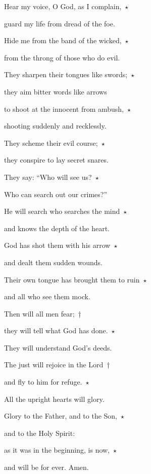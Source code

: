 \noindent Hear my voice, O God, as I complain,~$\star$~\nopagebreak

guard my life from dread of the foe.

\noindent Hide me from the band of the wicked,~$\star$~\nopagebreak

from the throng of those who do evil.

\noindent They sharpen their tongues like swords;~$\star$~\nopagebreak

they aim bitter words like arrows

\noindent to shoot at the innocent from ambush,~$\star$~\nopagebreak

shooting suddenly and recklessly.

\noindent They scheme their evil course;~$\star$~\nopagebreak

they conspire to lay secret snares.

\noindent They say: “Who will see us?~$\star$~\nopagebreak

Who can search out our crimes?”

\noindent He will search who searches the mind~$\star$~\nopagebreak

and knows the depth of the heart.

\noindent God has shot them with his arrow~$\star$~\nopagebreak

and dealt them sudden wounds.

\noindent Their own tongue has brought them to ruin~$\star$~\nopagebreak

and all who see them mock.

\noindent Then will all men fear;~†~\nopagebreak

they will tell what God has done.~$\star$~\nopagebreak

They will understand God’s deeds.

\noindent The just will rejoice in the Lord~†~\nopagebreak

and fly to him for refuge.~$\star$~\nopagebreak

All the upright hearts will glory.

\noindent Glory to the Father, and to the Son,~$\star$~\nopagebreak

and to the Holy Spirit:

\noindent as it was in the beginning, is now,~$\star$~\nopagebreak

and will be for ever. Amen.